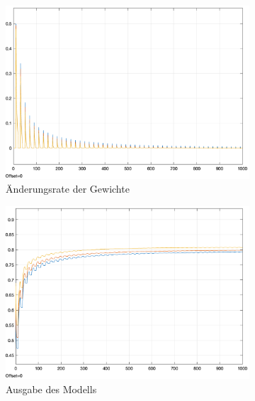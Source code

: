 \begin{figure}[h]
  \caption{Eine Annäherung an C-EP findet passende Parameter für das Netzwerk}
  \centering
  \begin{subfigure}[b]{0.3\textwidth}
    \includegraphics[width=\textwidth]{abbildungen/c_ep_approx_convergence_weight_update.png}
    \caption{Änderungsrate der Gewichte}
  \end{subfigure}%
  \hfill
  \begin{subfigure}[b]{0.3\textwidth}
    \includegraphics[width=\textwidth]{abbildungen/c_ep_approx_convergence_ausgabe.png}
    \caption{Ausgabe des Modells}
  \end{subfigure}%
  \hfill
  \begin{subfigure}[b]{0.3\textwidth}

\end{subfigure}
\end{figure}
